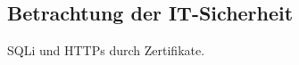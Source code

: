 \subsection{Betrachtung der IT-Sicherheit}
\label{sec:BetrachtungDerItSicherheit}

SQLi und HTTPs durch Zertifikate.